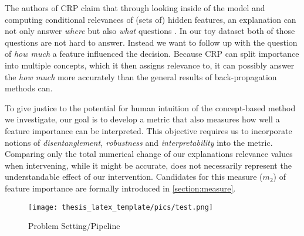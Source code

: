 The authors of CRP claim that through looking inside of the model and computing conditional relevances of (sets of) hidden features, an explanation can not only answer \textit{where} but also \textit{what} questions \cite{Achtibat2022}. In our toy dataset both of those questions are not hard to answer. Instead we want to follow up with the question of \textit{how much} a feature influenced the decision. Because CRP can split importance into multiple concepts, which it then assigns relevance to, it can possibly answer the \textit{how much} more accurately than the general results of back-propagation methods can.  


To give justice to the potential for human intuition of the concept-based method we investigate, our goal is to develop a metric that also measures how well a feature importance can be interpreted. This objective requires us to incorporate notions of \textit{disentanglement, robustness} and \textit{interpretability} into the metric. Comparing only the total numerical change of our explanations relevance values when intervening, while it might be accurate, does not necessarily represent the understandable effect of our intervention. 
Candidates for this measure ($m_2$) of feature importance are formally introduced in \autoref{section:measure}.

\begin{figure}[t!]
    \centering
    \texttt{[image: thesis\_latex\_template/pics/test.png]}
    \caption{Problem Setting/Pipeline}
    \label{fig:pipeline}
\end{figure}

